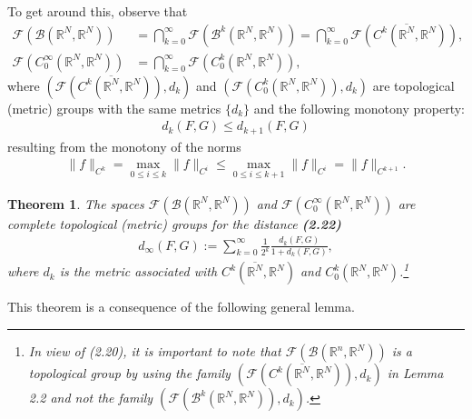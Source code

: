 \documentclass{book}
\numberwithin{equation}{section}
\newtheorem{theorem}{Theorem}[section]
\begin{document}
\begin{enumerate}
    To get around this, observe that
    \begin{align*}
        \mathcal{F}\left(\mathcal{B}(\mathbb{R}^N,\mathbb{R}^N)\right) &= \bigcap_{k=0}^\infty \mathcal{F}\left(\mathcal{B}^k(\mathbb{R}^N,\mathbb{R}^N)\right) = \bigcap_{k=0}^\infty \mathcal{F}\left(C^k(\overline{\mathbb{R}^N},\mathbb{R}^N)\right),\\
        \mathcal{F}\left(C_0^\infty(\mathbb{R}^N,\mathbb{R}^N)\right) &= \bigcap_{k=0}^\infty \mathcal{F}\left(C_0^k(\mathbb{R}^N,\mathbb{R}^N)\right),
    \end{align*}
    where $\left(\mathcal{F}(C^k(\overline{\mathbb{R}^N},\mathbb{R}^N)),d_k\right)$ and $\left(\mathcal{F}(C_0^k(\mathbb{R}^N,\mathbb{R}^N)),d_k\right)$ are topological (metric) groups with the same metrics $\{d_k\}$ and the following monotony property:
    \begin{align*}
        d_k(F,G)\le d_{k+1}(F,G)
    \end{align*}
    resulting from the monotony of the norms
    \begin{align*}
        \|f\|_{C^k} = \max_{0\le i\le k} \|f\|_{C^i}\le\max_{0\le i\le k+1} \|f\|_{C^i} = \|f\|_{C^{k+1}}.
    \end{align*}
    
    \begin{theorem}
        The spaces $\mathcal{F}(\mathcal{B}(\mathbb{R}^N,\mathbb{R}^N))$ and $\mathcal{F}(C_0^\infty(\mathbb{R}^N,\mathbb{R}^N))$ are complete topological (metric) groups for the distance \textbf{(2.22)}
        \begin{align*}
            d_\infty(F,G) := \sum_{k=0}^\infty \frac{1}{2^k}\frac{d_k(F,G)}{1 + d_k(F,G)},
        \end{align*}
        where $d_k$ is the metric associated with $C^k(\overline{\mathbb{R}^N},\mathbb{R}^N)$ and $C_0^k(\mathbb{R}^N,\mathbb{R}^N)$.\footnote{In view of (2.20), it is important to note that $\mathcal{F}(\mathcal{B}(\mathbb{R}^n,\mathbb{R}^N))$ is a topological group by using the family $(\mathcal{F}(C^k(\overline{\mathbb{R}^N},\mathbb{R}^N)),d_k)$ in Lemma 2.2 and not the family $(\mathcal{F}(\mathcal{B}^k(\mathbb{R}^N,\mathbb{R}^N)),d_k)$.}
    \end{theorem}
    This theorem is a consequence of the following general lemma.
    

\end{enumerate}
\end{document}
